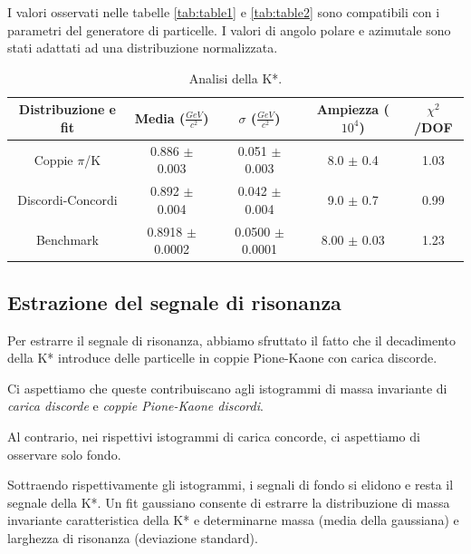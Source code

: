 \documentclass[12pt, a4paper]{article}
\begin{document}
I valori osservati nelle tabelle \ref{tab:table1} e \ref{tab:table2} sono compatibili con i parametri del generatore di particelle.
I valori di angolo polare e azimutale sono stati adattati ad una distribuzione normalizzata.

\begin{table}[H]
  \begin{center}
    \caption{Analisi della K*.}
    \label{tab:table3}
    \begin{tabular}{c|c|c|c|c} %
      \textbf{Distribuzione e fit} & 
      \textbf{Media ($\frac{GeV}{c^2}$)} & 
      \textbf{$\sigma$ ($\frac{GeV}{c^2}$)} & 
      \textbf{Ampiezza ($10^4$)} & 
      \textbf{$\chi^2$/DOF}\\
      
      \hline
      Coppie $\pi$/K  & 0.886 $\pm$ 0.003 &0.051 $\pm$ 0.003  & 8.0 $\pm$ 0.4 & 1.03\\
      Discordi-Concordi & 0.892 $\pm$ 0.004 & 0.042 $\pm$ 0.004 & 9.0 $\pm$ 0.7 & 0.99\\
      Benchmark & 0.8918 $\pm$ 0.0002 & 0.0500 $\pm$ 0.0001 & 8.00 $\pm$ 0.03  &  1.23\\
    \end{tabular}
  \end{center}
\end{table}

\subsection{Estrazione del segnale di risonanza}
Per estrarre il segnale di risonanza, abbiamo sfruttato il fatto che il decadimento della K* introduce delle particelle in coppie Pione-Kaone con carica discorde. 

Ci aspettiamo che queste contribuiscano agli istogrammi di massa invariante di \textit{carica discorde} e \textit{coppie Pione-Kaone discordi}.

Al contrario, nei rispettivi istogrammi di carica concorde, ci aspettiamo di osservare solo fondo.

Sottraendo rispettivamente gli istogrammi, i segnali di fondo si elidono e resta il segnale della K*.
Un fit gaussiano consente di estrarre la distribuzione di massa invariante caratteristica della K* e determinarne massa (media della gaussiana) e larghezza di risonanza (deviazione standard).
\end{document}
